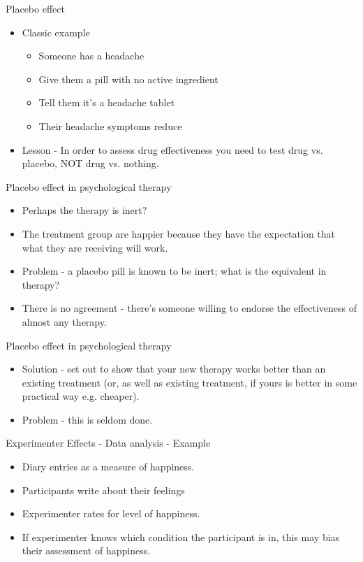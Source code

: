 \documentclass{beamer}
\begin{document}
\begin{frame}{Placebo effect}
\begin{itemize}
\item Classic example
\begin{itemize}
\item Someone  has a headache
\item Give them a pill with no active ingredient
\item Tell them it's a headache tablet
\item Their headache symptoms reduce
\end{itemize}
\item Lesson - In order to assess drug effectiveness you need to test drug vs. placebo, NOT drug vs. nothing.
\end{itemize}
\end{frame}

\begin{frame}{Placebo effect in psychological therapy}
\begin{itemize}
\item Perhaps the therapy is inert?
\item The treatment group are happier because they have the expectation that what they are receiving will work.
\item Problem - a placebo pill is known to be inert; what is the equivalent in therapy?
\item There is no agreement - there's someone willing to endorse the effectiveness of almost any therapy.
\end{itemize}
\end{frame}

\begin{frame}{Placebo effect in psychological therapy}
\begin{itemize}
\item Solution - set out to show that your new therapy works better than an existing treatment (or, as well as existing treatment, if yours is better in some practical way e.g. cheaper).
\item Problem - this is seldom done.
\end{itemize}
\end{frame}

\begin{frame}{Experimenter Effects - Data analysis - Example}
\begin{itemize}
\item Diary entries as a measure of happiness.
\item Participants write about their feelings
\item Experimenter rates for level of happiness.
\item If experimenter knows which condition the participant is in, this may bias their assessment of happiness.

\end{itemize}
\end{frame}
\end{document}
